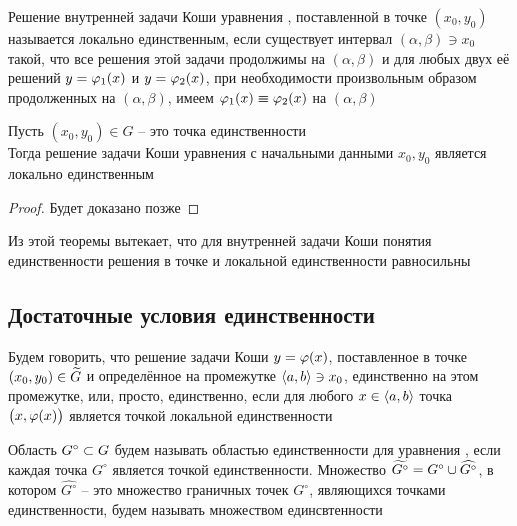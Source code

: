 \begin{definition}\label{def:uniq:local}
    Решение внутренней задачи Коши уравнения , поставленной в точке $ (x_0, y_0) $ называется локально единственным, если существует интервал $ (\alpha, \beta) \ni x_0 $ такой, что все решения этой задачи продолжимы на $ (\alpha, \beta) $ и для любых двух её решений $ y = \varphi_1(x) $ и $ y = \varphi_2(x) $, при необходимости произвольным образом продолженных на $ (\alpha, \beta) $, имеем $ \vphi_1(x) \equiv \vphi_2(x) $ на $ (\alpha, \beta) $
\end{definition}

\begin{theorem}\label{th:uniq-and-local-uniq}
	Пусть $ (x_0, y_0) \in G $ -- это точка единственности \\
    Тогда решение задачи Коши уравнения  с начальными данными $ x_0, y_0 $ является локально единственным
\end{theorem}

\begin{proof}
	Будет доказано позже
\end{proof}

\begin{implication}
	Из этой теоремы вытекает, что для внутренней задачи Коши понятия единственности решения в точке и локальной единственности равносильны
\end{implication}

\subsection{Достаточные условия единственности}

\begin{definition}
    Будем говорить, что решение задачи Коши $ y = \varphi(x) $, поставленное в точке $ (x_0, y_0) \in \widetilde{G} $ и определённое на промежутке $ \Braket{a, b} \ni x_0 $, единственно на этом промежутке, или, просто, единственно, если для любого $ x \in \Braket{a, b} $ точка $ \big( x, \varphi(x) \big) $ является точкой локальной единственности
\end{definition}

\begin{definition}
    Область $ G^\circ \subset G $ будем называть областью единственности для уравнения , если каждая точка $ G^\circ $ является точкой единственности. Множество $ \widetilde{G^\circ} = G^\circ \cup \widehat{G^\circ} $, в котором $ \hat{G^\circ} $ -- это множество граничных точек $ G^\circ $, являющихся точками единственности, будем называть множеством единсвтенности
\end{definition}

